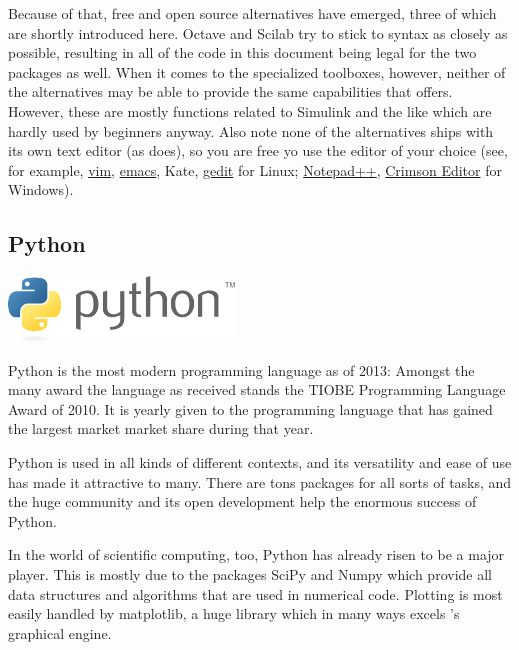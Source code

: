 Because of that, free and open source \matlab{} alternatives have emerged,
three of which are shortly introduced here. Octave and Scilab try to stick to
\matlab{} syntax as closely as possible, resulting in all of the code in this
document being legal for the two packages as well.  When it comes to the
specialized toolboxes, however, neither of the alternatives may be able to
provide the same capabilities that \matlab{} offers. However, these are mostly
functions related to Simulink and the like which are hardly used by beginners
anyway.  Also note none of the alternatives ships with its own text editor (as
\matlab{} does), so you are free yo use the editor of your choice (see, for
example, \href{http://www.vim.org/}{vim},
\href{http://www.gnu.org/software/emacs/}{emacs}, Kate,
\href{http://projects.gnome.org/gedit/}{gedit} for Linux;
\href{http://notepad-plus.sourceforge.net/uk/site.htm}{Notepad++},
\href{http://www.crimsoneditor.com/}{Crimson Editor} for Windows).

\subsection{Python}

\begin{floatingfigure}[r]{6cm}
\centering
\includegraphics[width=6cm]{figures/python-logo-generic}
\end{floatingfigure}

Python is the most modern programming language as of 2013: Amongst the many
award the language as received stands the TIOBE Programming Language Award of
2010. It is yearly given to the programming language that has gained the
largest market market share during that year.

Python is used in all kinds of different contexts, and its versatility and
ease of use has made it attractive to many. There are tons packages for all
sorts of tasks, and the huge community and its open development help the
enormous success of Python.

In the world of scientific computing, too, Python has already risen to be a
major player. This is mostly due to the packages SciPy and Numpy which provide
all data structures and algorithms that are used in numerical code. Plotting
is most easily handled by matplotlib, a huge library which in many ways excels
\matlab{}'s graphical engine.

